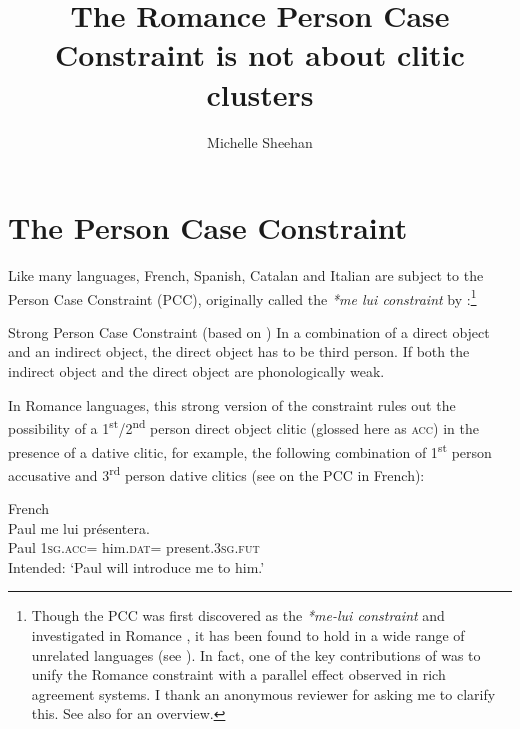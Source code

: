 \documentclass[output=paper,colorlinks,citecolor=brown,nonflat]{./langscibook}
\author{Michelle Sheehan	\affiliation{Anglia Ruskin University}}
\title{The Romance Person Case Constraint is not about clitic clusters}
\begin{document}
\maketitle 

\section{The Person Case Constraint}\label{sec:sheehan:1}

Like many languages, French, Spanish, Catalan and Italian are subject to the Person Case Constraint (PCC), originally called the \textit{*me lui constraint} by \citet{Perlmutter1971}:\footnote{Though the PCC was first discovered as the \textit{*me-lui constraint} and investigated in Romance \citep{Perlmutter1971}, it has been found to hold in a wide range of unrelated languages (see \citealt{Bonet1991, Albizu1997, Rezac2008, Haspelmath2004, AdgerHarbour2007}). In fact, one of the key contributions of \citet{Bonet1991} was to unify the Romance constraint with a parallel effect observed in rich agreement systems. I thank an anonymous reviewer for asking me to clarify this. See also \citet{Bonet2007} for an overview.} 

\ea%
    \label{ex:sheehan:1}
    Strong Person Case Constraint (based on \citealt[181--182]{Bonet1991})
    \ea\label{ex:sheehan:1a}
    In a combination of a direct object and an indirect object, the direct object has to be third person.
    \ex\label{ex:sheehan:1b}
    If both the indirect object and the direct object are phonologically weak.
    \z
\z

In Romance languages, this strong version of the constraint rules out the possibility of a 1\textsuperscript{st}/2\textsuperscript{nd} person direct object clitic (glossed here as \textsc{acc}) in the presence of a dative clitic, for example, the following combination of 1\textsuperscript{st} person accusative and 3\textsuperscript{rd} person dative clitics (see \citealt{Perlmutter1971, Kayne1975, Postal1981} on the PCC in French):

\ea%
    \label{ex:sheehan:2}
    French \citep[173]{Kayne1975}\\
    \gll    *Paul   me       lui       présentera.\\
            Paul   \textsc{1sg}.\textsc{acc}=   him.\textsc{dat=} present.\textsc{3sg.fut}\\
    \glt    Intended: ‘Paul will introduce me to him.’
\z
\end{document}
